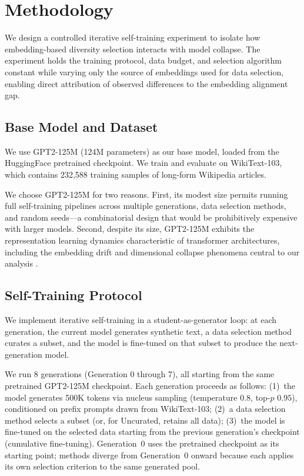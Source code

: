 \section{Methodology}

We design a controlled iterative self-training experiment to isolate how embedding-based diversity selection interacts with model collapse. The experiment holds the training protocol, data budget, and selection algorithm constant while varying only the source of embeddings used for data selection, enabling direct attribution of observed differences to the embedding alignment gap.

\subsection{Base Model and Dataset}

We use GPT2-125M (124M parameters) as our base model, loaded from the HuggingFace pretrained checkpoint. We train and evaluate on WikiText-103, which contains 232,588 training samples of long-form Wikipedia articles.

We choose GPT2-125M for two reasons. First, its modest size permits running full self-training pipelines across multiple generations, data selection methods, and random seeds---a combinatorial design that would be prohibitively expensive with larger models. Second, despite its size, GPT2-125M exhibits the representation learning dynamics characteristic of transformer architectures, including the embedding drift and dimensional collapse phenomena central to our analysis \citep{jing2022understanding}.

\subsection{Self-Training Protocol}

We implement iterative self-training in a student-as-generator loop: at each generation, the current model generates synthetic text, a data selection method curates a subset, and the model is fine-tuned on that subset to produce the next-generation model.

We run 8 generations (Generation 0 through 7), all starting from the same pretrained GPT2-125M checkpoint. Each generation proceeds as follows: (1)~the model generates 500K tokens via nucleus sampling (temperature $0.8$, top-$p$ $0.95$), conditioned on prefix prompts drawn from WikiText-103; (2)~a data selection method selects a subset (or, for Uncurated, retains all data); (3)~the model is fine-tuned on the selected data starting from the previous generation's checkpoint (cumulative fine-tuning). Generation~0 uses the pretrained checkpoint as its starting point; methods diverge from Generation~0 onward because each applies its own selection criterion to the same generated pool.

